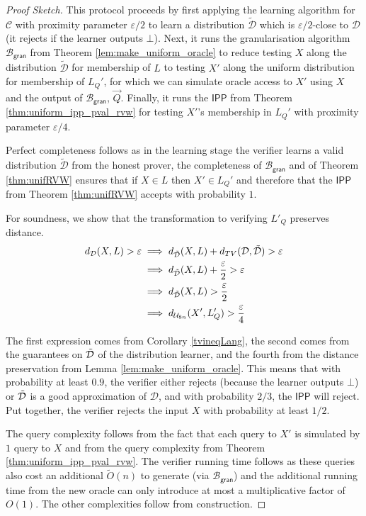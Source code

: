 \documentclass[11pt]{article}
\newcommand{\IPP}{\mathsf{IPP}}
\newcommand{\gran}{\mathsf{gran}}
\newcommand{\sU}{\mathcal{U}}
\newcommand{\sD}{\mathcal{D}}
\newcommand{\sB}{\mathcal{B}}
\begin{document}
\begin{proof}[Proof Sketch]

This protocol proceeds by first applying the learning algorithm for $\mathcal{C}$ with proximity parameter $\varepsilon/2$  to learn a distribution $\tilde{\sD}$ which is $\varepsilon/2$-close to $\sD$ (it rejects if the learner outputs $\bot$). Next, it runs the granularisation algorithm $\sB_\gran$ from Theorem \ref{lem:make_uniform_oracle} to reduce testing $X$ along the distribution $\tilde{\sD}$ for membership of $L$ to testing $X'$ along the uniform distribution for membership of $L_Q'$, for which we can simulate oracle access to $X'$ using $X$ and the output of $\sB_\gran$, $\vec{Q}$. Finally, it runs the $\IPP$ from Theorem \ref{thm:uniform_ipp_pval_rvw} for testing $X'$'s membership in $L_Q'$ with proximity parameter $\varepsilon/4$.

Perfect completeness follows as in the learning stage the verifier learns a valid distribution $\tilde{\sD}$ from the honest prover, the completeness of $\sB_\gran$ and of Theorem \ref{thm:unifRVW} ensures that if $X\in L$ then $X'\in L_Q'$ and therefore that the $\IPP$ from Theorem \ref{thm:unifRVW} accepts with probability $1$.

For soundness, we show that the transformation to verifying $L'_Q$ preserves distance.
\[
\begin{split}
    d_{\sD}(X,L)>\varepsilon &\implies d_{\Tilde{\sD}}(X,L)+d_{TV}(\sD, \Tilde{\sD})>\varepsilon\\
    &\implies d_{\Tilde{\sD}}(X,L)+\frac{\varepsilon}{2}>\varepsilon\\
    &\implies d_{\Tilde{\sD}}(X,L)>\frac{\varepsilon}{2}\\
    &\implies d_{\sU_{8n}}(X',L_Q')>\frac{\varepsilon}{4}\\
\end{split}
\]

The first expression comes from Corollary \ref{tvineqLang}, the second comes from the guarantees on $\Tilde{\sD}$ of the distribution learner, and the fourth from the distance preservation from Lemma \ref{lem:make_uniform_oracle}. This means that with probability at least $0.9$, the verifier either rejects (because the learner outputs $\bot$) or $\Tilde{\sD}$ is a good approximation of $\sD$, and with probability $2/3$, the $\IPP$ will reject. Put together, the verifier rejects the input $X$ with probability at least $1/2$.

The query complexity follows from the fact that each query to $X'$ is simulated by $1$ query to $X$ and from the query complexity from Theorem \ref{thm:uniform_ipp_pval_rvw}. The verifier running time follows as these queries also cost an additional $\tilde{O}(n)$ to generate (via $\sB_\gran$) and the additional running time from the new oracle can only introduce at most a multiplicative factor of $O(1)$. The other complexities follow from construction.
\end{proof}
\end{document}

